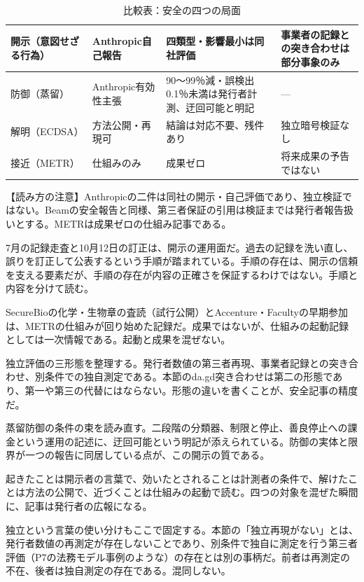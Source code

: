 \documentclass[lualatex,a4paper,10pt]{jlreq}
\begin{document}
\begin{table}[htbp]\centering\footnotesize
\caption{比較表：安全の四つの局面}
\begin{tabularx}{0.96\linewidth}{@{}lXXX@{}}
\toprule
開示（意図せざる行為） & Anthropic自己報告 & 四類型・影響最小は同社評価 & 事業者の記録との突き合わせは部分事象のみ \\
\midrule
防御（蒸留） & Anthropic有効性主張 & 90〜99％減・誤検出0.1％未満は発行者計測、迂回可能と明記 & --- \\
\midrule
解明（ECDSA） & 方法公開・再現可 & 結論は対応不要、残件あり & 独立暗号検証なし \\
\midrule
接近（METR） & 仕組みのみ & 成果ゼロ & 将来成果の予告ではない \\
\bottomrule
\end{tabularx}
\end{table}
\begin{tcolorbox}[colback=SurveySoft,colframe=SurveyRule,arc=1mm,boxrule=0.4pt,left=2mm,right=2mm]
【読み方の注意】Anthropicの二件は同社の開示・自己評価であり、独立検証ではない。Beamの安全報告と同様、第三者保証の引用は検証までは発行者報告扱いとする。METRは成果ゼロの仕組み記事である。
\end{tcolorbox}
7月の記録走査と10月12日の訂正は、開示の運用面だ。過去の記録を洗い直し、誤りを訂正して公表するという手順が踏まれている。手順の存在は、開示の信頼を支える要素だが、手順の存在が内容の正確さを保証するわけではない。手順と内容を分けて読む。

SecureBioの化学・生物章の査読（試行公開）とAccenture・Facultyの早期参加は、METRの仕組みが回り始めた記録だ。成果ではないが、仕組みの起動記録としては一次情報である。起動と成果を混ぜない。

独立評価の三形態を整理する。発行者数値の第三者再現、事業者記録との突き合わせ、別条件での独自測定である。本節のda.gd突き合わせは第二の形態であり、第一や第三の代替にはならない。形態の違いを書くことが、安全記事の精度だ。

蒸留防御の条件の束を読み直す。二段階の分類器、制限と停止、善良停止への課金という運用の記述に、迂回可能という明記が添えられている。防御の実体と限界が一つの報告に同居している点が、この開示の質である。

起きたことは開示者の言葉で、効いたとされることは計測者の条件で、解けたことは方法の公開で、近づくことは仕組みの起動で読む。四つの対象を混ぜた瞬間に、記事は発行者の広報になる。

独立という言葉の使い分けもここで固定する。本節の「独立再現がない」とは、発行者数値の再測定が存在しないことであり、別条件で独自に測定を行う第三者評価（P7の法務モデル事例のような）の存在とは別の事柄だ。前者は再測定の不在、後者は独自測定の存在である。混同しない。
\end{document}
